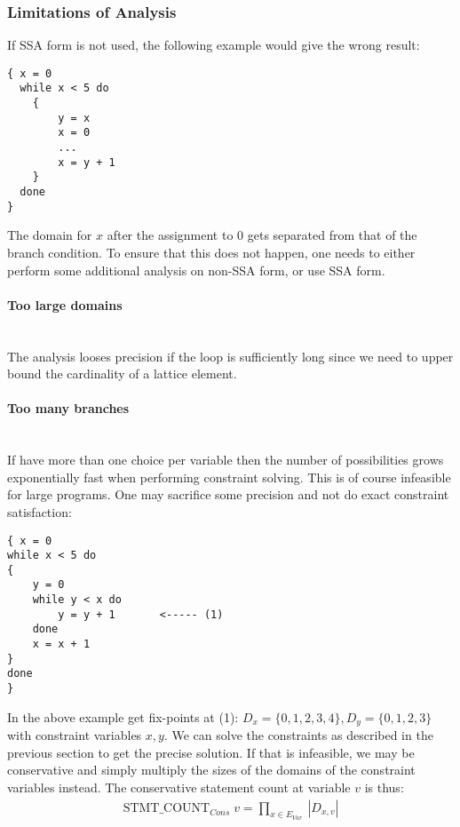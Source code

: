\documentclass[a4paper]{article}
\newcommand{\NL}[0]{ \hfill\\\noindent }
\begin{document}
\subsubsection{Limitations of Analysis}
If SSA form is not used, the following example would give the wrong result:

\begin{verbatim}
{ x = 0
  while x < 5 do
  	{
  		y = x
  		x = 0
  		...
  		x = y + 1
  	}
  done 
}
\end{verbatim}
\noindent The domain for $x$ after the assignment to $0$ gets separated from that of the branch condition. To ensure that this does not happen, one needs to either perform some additional analysis on non-SSA form, or use SSA form.

\paragraph{Too large domains}\NL
The analysis looses precision if the loop is sufficiently long since we need to upper bound the cardinality of a lattice element.

\paragraph{Too many branches}\NL
If have more than one choice per variable then the number of possibilities grows exponentially fast when performing constraint solving. This is of course infeasible for large programs. One may sacrifice some precision and not do exact constraint satisfaction: 

\begin{verbatim}
{ x = 0
while x < 5 do
{
    y = 0
    while y < x do 
        y = y + 1       <----- (1)
    done 
    x = x + 1
}
done
}
\end{verbatim}
\noindent
In the above example get fix-points at (1): $D_x = \{0,1,2,3,4\}, D_y = \{0,1,2,3\}$ with constraint variables $x, y$. We can solve the constraints as described in the previous section to get the precise solution. If that is infeasible, we may be conservative and simply multiply the sizes of the domains of the constraint variables instead. The conservative statement count at variable $v$ is thus:
\begin{align*}
\text{STMT\_COUNT}_{Cons}\;v = \prod_{ x \in E_{Var}\;} |D_{x,v}|
\end{align*}

%
\end{document}
